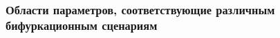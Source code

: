 \documentclass[fullscreen=true, unicode, bookmarks=false]{beamer}
\begin{document}
\begin{frame}
\frametitle{Области параметров, соответствующие различным бифуркационным сценариям }

\begin{figure}[h]
\hspace{-1.5cm}
\begin{minipage}[h]{0.2\linewidth}
\end{minipage}
\hspace{1.5cm}
\begin{minipage}[h]{0.2\linewidth}

\end{minipage}
\end{figure}
\end{frame}
\end{document}

